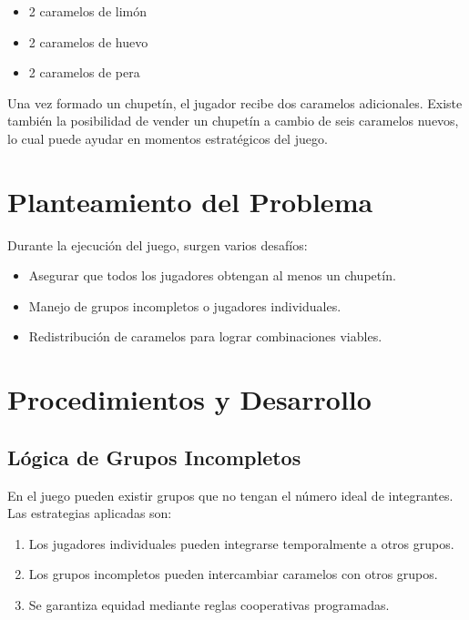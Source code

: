 \documentclass[12pt,spanish]{article}
\begin{document}
\begin{itemize}
  \item 2 caramelos de limón
  \item 2 caramelos de huevo
  \item 2 caramelos de pera
\end{itemize}

Una vez formado un chupetín, el jugador recibe dos caramelos adicionales. Existe también la posibilidad de vender un chupetín a cambio de seis caramelos nuevos, lo cual puede ayudar en momentos estratégicos del juego.

\section{Planteamiento del Problema}

Durante la ejecución del juego, surgen varios desafíos:

\begin{itemize}
  \item Asegurar que todos los jugadores obtengan al menos un chupetín.
  \item Manejo de grupos incompletos o jugadores individuales.
  \item Redistribución de caramelos para lograr combinaciones viables.
\end{itemize}

\section{Procedimientos y Desarrollo}

\subsection{Lógica de Grupos Incompletos}

En el juego pueden existir grupos que no tengan el número ideal de integrantes. Las estrategias aplicadas son:

\begin{enumerate}
  \item Los jugadores individuales pueden integrarse temporalmente a otros grupos.
  \item Los grupos incompletos pueden intercambiar caramelos con otros grupos.
  \item Se garantiza equidad mediante reglas cooperativas programadas.
\end{enumerate}
\end{document}
